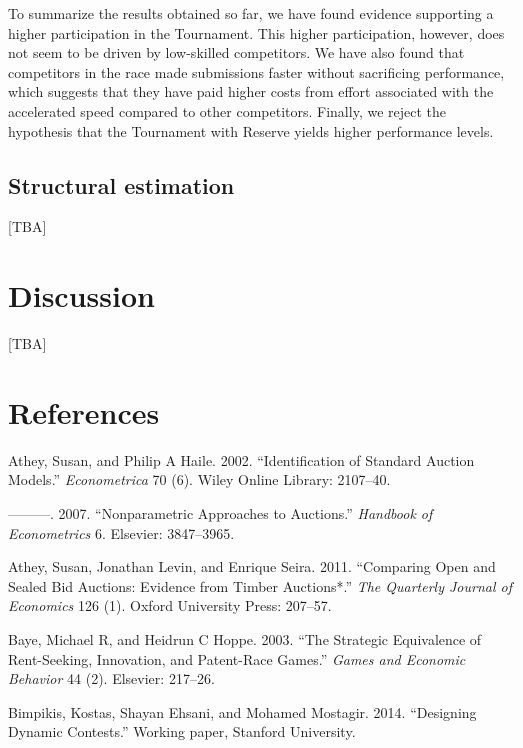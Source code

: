 \documentclass[10pt, titlepage]{article}
\begin{document}
To summarize the results obtained so far, we have found evidence
supporting a higher participation in the Tournament. This higher
participation, however, does not seem to be driven by low-skilled
competitors. We have also found that competitors in the race made
submissions faster without sacrificing performance, which suggests that
they have paid higher costs from effort associated with the accelerated
speed compared to other competitors. Finally, we reject the hypothesis
that the Tournament with Reserve yields higher performance levels.

\subsection{Structural estimation}\label{structural-estimation}

{[}TBA{]}

\section{Discussion}\label{discussion}

{[}TBA{]}

\section*{References}\label{references}

\hypertarget{refs}{}
\hypertarget{ref-athey2002identification}{}
Athey, Susan, and Philip A Haile. 2002. ``Identification of Standard
Auction Models.'' \emph{Econometrica} 70 (6). Wiley Online Library:
2107--40.

\hypertarget{ref-athey2007nonparametric}{}
---------. 2007. ``Nonparametric Approaches to Auctions.''
\emph{Handbook of Econometrics} 6. Elsevier: 3847--3965.

\hypertarget{ref-athey2011comparing}{}
Athey, Susan, Jonathan Levin, and Enrique Seira. 2011. ``Comparing Open
and Sealed Bid Auctions: Evidence from Timber Auctions*.'' \emph{The
Quarterly Journal of Economics} 126 (1). Oxford University Press:
207--57.

\hypertarget{ref-baye2003strategic}{}
Baye, Michael R, and Heidrun C Hoppe. 2003. ``The Strategic Equivalence
of Rent-Seeking, Innovation, and Patent-Race Games.'' \emph{Games and
Economic Behavior} 44 (2). Elsevier: 217--26.

\hypertarget{ref-bimpikis2014designing}{}
Bimpikis, Kostas, Shayan Ehsani, and Mohamed Mostagir. 2014. ``Designing
Dynamic Contests.'' Working paper, Stanford University.
\end{document}
